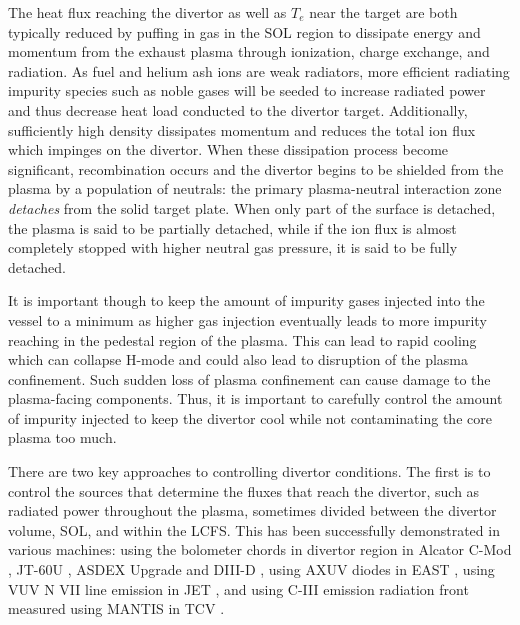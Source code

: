 The heat flux reaching the divertor as well as $T_e$ near the target are both typically reduced by puffing in gas in the \ac{SOL} region to dissipate energy and momentum from the exhaust plasma through ionization, charge exchange, and radiation.
As fuel and helium ash ions are weak radiators, more efficient radiating impurity species such as noble gases will be seeded to increase radiated power and thus decrease heat load conducted to the divertor target.
Additionally, sufficiently high density dissipates momentum and reduces the total ion flux which impinges on the divertor.
When these dissipation process become significant, recombination occurs and the divertor begins to be shielded from the plasma by a population of neutrals: the primary plasma-neutral interaction zone \emph{detaches} from the solid target plate.
When only part of the surface is detached, the plasma is said to be partially detached, while if the ion flux is almost completely stopped with higher neutral gas pressure, it is said to be fully detached.

It is important though to keep the amount of impurity gases injected into the vessel to a minimum as higher gas injection eventually leads to more impurity reaching in the pedestal region of the plasma.
This can lead to rapid cooling which can collapse H-mode and could also lead to disruption of the plasma confinement.
Such sudden loss of plasma confinement can cause damage to the plasma-facing components.
Thus, it is important to carefully control the amount of impurity injected to keep the divertor cool while not contaminating the core plasma too much.

There are two key approaches to controlling divertor conditions.
The first is to control the sources that determine the fluxes that reach the divertor, such as radiated power throughout the plasma, sometimes divided between the divertor volume, \ac{SOL}, and within the \ac{LCFS}.
This has been successfully demonstrated in various machines:
using the bolometer chords in divertor region in Alcator \mbox{C-Mod} \cite{Goetz_1999_POP}, \mbox{JT-60U} \cite{Asakura_2009_NF}, ASDEX Upgrade \cite{Kallenbach_2012_NF} and \mbox{DIII-D} \cite{Eldon_2019_NME},
using AXUV diodes in EAST \cite{Wu_2018_NF},
using VUV N VII line emission in JET \cite{Maddison_2011_NF}, and
using C-III emission radiation front measured using MANTIS in TCV \cite{Ravensbergen_2021_NC}.

